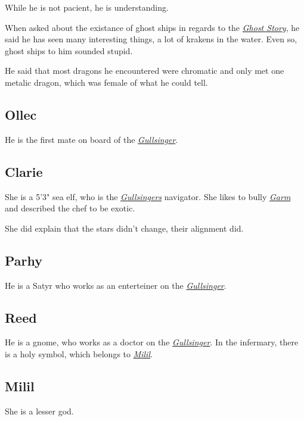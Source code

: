 \documentclass{article}
\begin{document}
\begin{multicols}{2}
    While he is not pacient, he is understanding.

    When asked about the existance of ghost ships in regards to the \hyperref[gohl]{\textit{Ghost Story}}, he said he has seen many interesting things, a lot of krakens in the water. Even so, ghost ships to him sounded
    stupid.

    He said that most dragons he encountered were chromatic and only met one metalic dragon, which was female of what he could tell.

    \subsection{Ollec}
    \label{ollec}

    He is the first mate on board of the \hyperref[gullsinger]{\textit{Gullsinger}}.

    \subsection{Clarie}
    \label{clarie}

    She is a 5'3" sea elf, who is the \hyperref[gullsinger]{\textit{Gullsingers}} navigator. She likes to bully \hyperref[garm]{\textit{Garm}} and described the chef to be exotic.

    She did explain that the stars didn't change, their alignment did.

    \subsection{Parhy}
    \label{parhy}

    He is a Satyr who works as an enterteiner on the \hyperref[gullsinger]{\textit{Gullsinger}}.

    \subsection{Reed}
    \label{reed}

    He is a gnome, who works as a doctor on the \hyperref[gullsinger]{\textit{Gullsinger}}. In the infermary, there is a holy symbol, which belongs to \hyperref[milil]{\textit{Milil}}.

    \subsection{Milil}
    \label{milil}

    She is a lesser god.


\end{multicols}
\end{document}
